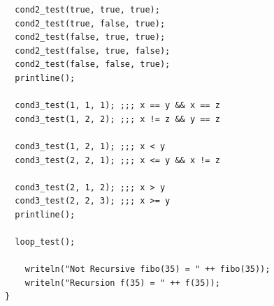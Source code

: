 \documentclass{homework}
\begin{document}
\begin{answer}
\begin{verbatim}
  cond2_test(true, true, true);
  cond2_test(true, false, true);
  cond2_test(false, true, true);
  cond2_test(false, true, false);
  cond2_test(false, false, true);
  printline();

  cond3_test(1, 1, 1); ;;; x == y && x == z
  cond3_test(1, 2, 2); ;;; x != z && y == z

  cond3_test(1, 2, 1); ;;; x < y
  cond3_test(2, 2, 1); ;;; x <= y && x != z

  cond3_test(2, 1, 2); ;;; x > y
  cond3_test(2, 2, 3); ;;; x >= y
  printline();

  loop_test();

	writeln("Not Recursive fibo(35) = " ++ fibo(35));
	writeln("Recursion f(35) = " ++ f(35));
}
  \end{verbatim}
\end{answer}
\end{document}
